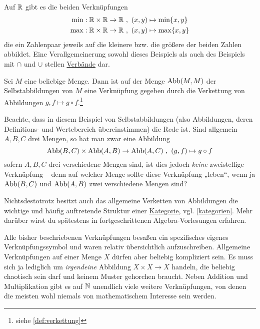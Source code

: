\begin{bsp} \label{bsp:minmaxverknuepfung}
    Auf $\mathbb R$ gibt es die beiden Verknüpfungen
    \begin{align*}
        \min : \mathbb R\times \mathbb R\to \mathbb R\ &,\ (x,y)\mapsto \min\{x,y\} \\
        \max : \mathbb R\times \mathbb R\to \mathbb R\ &,\ (x,y)\mapsto \max\{x,y\}
    \end{align*}
    die ein Zahlenpaar jeweils auf die kleinere bzw. die größere der beiden Zahlen abbildet. Eine Verallgemeinerung sowohl dieses Beispiels als auch des Beispiels mit $\cap$ und $\cup$ stellen \href{https://de.wikipedia.org/wiki/Verband_(Mathematik)}{Verbände} dar.
\end{bsp}


\begin{bsp}
    Sei $M$ eine beliebige Menge. Dann ist auf der Menge $\operatorname{Abb}(M,M)$ der Selbstabbildungen von $M$ eine Verknüpfung gegeben durch die Verkettung von Abbildungen $g,f\mapsto g\circ f$.\footnote{siehe \cref{def:verkettung}}
\end{bsp}


\begin{bem}[*]
    Beachte, dass in diesem Beispiel von Selbstabbildungen (also Abbildungen, deren Definitions- und Wertebereich übereinstimmen) die Rede ist. Sind allgemein $A,B,C$ drei Mengen, so hat man zwar eine Abbildung
        \[ \Abb(B,C) \times \Abb(A,B) \to \Abb(A,C) \ ,\ (g,f) \mapsto g\circ f \]
    sofern $A,B,C$ drei verschiedene Mengen sind, ist dies jedoch \emph{keine} zweistellige Verknüpfung -- denn auf welcher Menge sollte diese Verknüpfung „leben“, wenn ja $\operatorname{Abb}(B,C)$ und $\operatorname{Abb}(A,B)$ zwei verschiedene Mengen sind?

    Nichtsdestotrotz besitzt auch das allgemeine Verketten von Abbildungen die wichtige und häufig auftretende Struktur einer \href{https://ncatlab.org/nlab/show/category}{Kategorie}, vgl. \cref{kategorien}. Mehr darüber wirst du spätestens in fortgeschrittenen Algebra-Vorlesungen erfahren.
\end{bem}


\begin{bem}
    Alle bisher beschriebenen Verknüpfungen besaßen ein spezifisches eigenes Verknüpfungssymbol und waren relativ übersichtlich aufzuschreiben. Allgemeine Verknüpfungen auf einer Menge $X$ dürfen aber beliebig kompliziert sein. Es muss sich ja lediglich um \emph{irgendeine} Abbildung $X\times X\to X$ handeln, die beliebig chaotisch sein darf und keinem Muster gehorchen braucht. Neben Addition und Multiplikation gibt es auf $\mathbb N$ unendlich viele weitere Verknüpfungen, von denen die meisten wohl niemals von mathematischem Interesse sein werden.
\end{bem}


